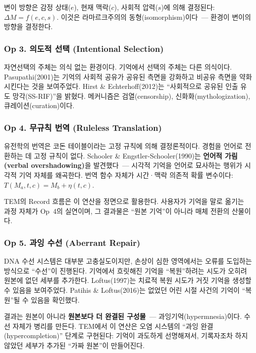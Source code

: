 \documentclass[11pt, a4paper]{article}
\begin{document}
변이 방향은 감정 상태($e$), 현재 맥락($c$), 사회적 압력($s$)에 의해 결정된다: $\Delta M = f(e, c, s)$. 이것은 라마르크주의의 동형(isomorphism)이다~--- 환경이 변이의 방향을 결정한다.

\subsubsection{Op 3. 의도적 선택 (Intentional Selection)}

자연선택의 주체는 의식 없는 환경이다. 기억에서 선택의 주체는 다른 의식이다. Pasupathi(2001)는 기억의 사회적 공유가 공유된 측면을 강화하고 비공유 측면을 약화시킨다는 것을 보여주었다\cite{pasupathi2001}. Hirst \& Echterhoff(2012)는 ``사회적으로 공유된 인출 유도 망각(SS-RIF)''을 밝혔다\cite{hirst2012}. 메커니즘은 검열(censorship), 신화화(mythologization), 큐레이션(curation)이다.

\subsubsection{Op 4. 무규칙 번역 (Ruleless Translation)}

유전학의 번역은 코돈 테이블이라는 고정 규칙에 의해 결정론적이다. 경험을 언어로 전환하는 데 고정 규칙이 없다. Schooler \& Engstler-Schooler(1990)는 \textbf{언어적 가림(verbal overshadowing)}을 발견했다\cite{schooler1990}~--- 시각적 기억을 언어로 묘사하는 행위가 시각적 기억 자체를 왜곡한다. 번역 함수 자체가 시간·맥락 의존적 확률 변수이다: $T(M_a, t, c) = M_b + \eta(t, c)$.

TEM의 Record 흐름은 이 연산을 정면으로 활용한다. 사용자가 기억을 말로 옮기는 과정 자체가 Op~4의 실연이며, 그 결과물은 ``원본 기억''이 아니라 매체 전환의 산물이다.

\subsubsection{Op 5. 과잉 수선 (Aberrant Repair)}

DNA 수선 시스템은 대부분 고충실도이지만, 손상이 심한 영역에서는 오류를 도입하는 방식으로 ``수선''이 진행된다\cite{sale2013,lieber2010}. 기억에서 흐릿해진 기억을 ``복원''하려는 시도가 오히려 원본에 없던 세부를 추가한다. Loftus(1997)는 치료적 복원 시도가 거짓 기억을 생성할 수 있음을 보여주었다\cite{loftus1997}. Patihis \& Loftus(2016)는 없었던 어린 시절 사건의 기억이 ``복원''될 수 있음을 확인했다\cite{patihis2016}.

결과는 원본이 아니라 \textbf{원본보다 더 완결된 구성물}~--- 과잉기억(hypermnesia)이다. 수선 자체가 병리를 만든다. TEM에서 이 연산은 오염 시스템의 ``과잉 완결(hypercompletion)'' 단계로 구현된다: 기억이 과도하게 선명해져서, 기록자조차 하지 않았던 세부가 추가된 ``가짜 원본''이 만들어진다.
\end{document}
